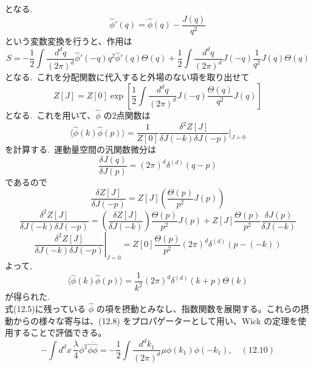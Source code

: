 \documentclass[uplatex,dvipdfmx]{jsarticle}
\begin{document}
となる.
\begin{equation}
    \hat{\phi}'(q) = \hat{\phi}(q) - \frac{J(q)}{q^2}
\end{equation}
という変数変換を行うと、作用は
\begin{equation}
    S = -\frac{1}{2} \int \frac{d^d q}{(2\pi)^d} \hat{\phi}'(-q) q^2 \hat{\phi}'(q) \Theta(q) + \frac{1}{2} \int \frac{d^d q}{(2\pi)^d} J(-q) \frac{1}{q^2} J(q) \Theta(q)
\end{equation}
となる.~これを分配関数に代入すると外場のない項を取り出せて
\begin{equation}
    Z[J] = Z[0] \exp\left[ \frac{1}{2} \int \frac{d^d q}{(2\pi)^d} J(-q) \frac{\Theta(q)}{q^2} J(q) \right]
\end{equation}
となる.~これを用いて、$\hat{\phi}$ の2点関数は
\begin{equation}
    \langle \hat{\phi}(k) \hat{\phi}(p) \rangle = \frac{1}{Z[0]} \frac{\delta^2 Z[J]}{\delta J(-k) \delta J(-p)}\bigg|_{J=0} 
\end{equation}
を計算する.~運動量空間の汎関数微分は
\begin{equation}
    \frac{\delta J(q)}{\delta J(p)} = (2\pi)^d \delta^{(d)}(q-p)
\end{equation}
であるので
\begin{equation}
    \frac{\delta Z[J]}{\delta J(-p)} = Z[J] \left( \frac{\Theta(p)}{p^2} J(p) \right)
\end{equation}
\begin{equation}
    \frac{\delta^2 Z[J]}{\delta J(-k) \delta J(-p)} = \left( \frac{\delta Z[J]}{\delta J(-k)} \right) \frac{\Theta(p)}{p^2} J(p) + Z[J] \frac{\Theta(p)}{p^2} \frac{\delta J(p)}{\delta J(-k)}
\end{equation}
\begin{equation}
    \left. \frac{\delta^2 Z[J]}{\delta J(-k) \delta J(-p)} \right|_{J=0} = Z[0] \frac{\Theta(p)}{p^2} (2\pi)^d \delta^{(d)}(p - (-k))
\end{equation}
よって,~
\begin{equation}
    \langle \hat{\phi}(k) \hat{\phi}(p) \rangle = \frac{1}{k^2} (2\pi)^d \delta^{(d)}(k+p) \Theta(k)
\end{equation}
が得られた.\\
式(12.5)に残っている $\hat{\phi}$ の項を摂動とみなし、指数関数を展開する。これらの摂動からの様々な寄与は、(12.8) をプロパゲーターとして用い、Wick の定理を使用することで評価できる。
\begin{equation}
    - \int d^d x \, \frac{\lambda}{4} \phi^2 \overline{\hat{\phi} \hat{\phi}} = - \frac{1}{2} \int \frac{d^d k_1}{(2\pi)^d} \mu \phi(k_1) \phi(-k_1), \quad (12.10)
\end{equation}
\end{document}
